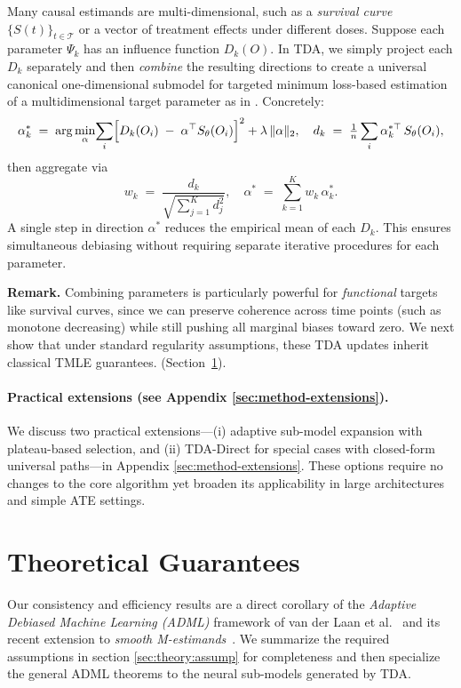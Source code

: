 \documentclass{article}
\theoremstyle{remark}
\begin{document}
Many causal estimands are multi-dimensional, such as a \emph{survival curve} $\{S(t)\}_{t\in\mathcal{T}}$ or a vector of treatment effects under different doses.  Suppose each parameter $\Psi_k$ has an influence function $D_k(O)$.  In TDA, we simply project each $D_k$ separately and then \emph{combine} the resulting directions to create a universal canonical one-dimensional submodel for targeted minimum
loss-based estimation of a multidimensional target parameter as in \cite{van2016one}.  Concretely:
\[
  \alpha^*_k 
  \;=\;
  \arg\min_{\alpha}\!\sum_i \Bigl[
    D_k(O_i) \;-\;\alpha^\top S_{\theta}(O_i)\Bigr]^2 
    + \lambda\,\|\alpha\|_2,
  \quad
  d_k \;=\;\tfrac1n\sum_i\alpha_k^{*\top}\,S_{\theta}(O_i),
\]
then aggregate via
\[
  w_k \;=\; \frac{d_k}{\sqrt{\sum_{j=1}^K d_j^2}}, 
  \quad
  \alpha^* 
  \;=\;\sum_{k=1}^K w_k\,\alpha^*_k.
\]
A single step in direction $\alpha^*$ reduces the empirical mean of each $D_k$.  This ensures simultaneous debiasing without requiring separate iterative procedures for each parameter.

\vspace{0.5em}
\noindent \textbf{Remark.}  
Combining parameters is particularly powerful for \emph{functional} targets like survival curves, since we can preserve coherence across time points (such as monotone decreasing) while still pushing all marginal biases toward zero.  We next show that under standard regularity assumptions, these TDA updates inherit classical TMLE guarantees.  (Section~\ref{sec:theory}). 

\paragraph{Practical extensions (see Appendix \ref{sec:method-extensions}).}
We discuss two practical extensions—(i) adaptive sub-model expansion with
plateau-based selection, and (ii) TDA-Direct for special cases with
closed-form universal paths—in Appendix \ref{sec:method-extensions}.  
These options require no changes to the core algorithm yet broaden its
applicability in large architectures and simple ATE settings.

\section{Theoretical Guarantees}
\label{sec:theory}


Our consistency and efficiency results are a direct corollary of the \emph{Adaptive
Debiased Machine Learning (ADML)} framework of
van der Laan et al.~\cite{van2023adaptive} and its recent extension to \emph{smooth
M-estimands}~\cite{van2025automatic}.  We summarize the required assumptions
in section \ref{sec:theory:assump} for completeness and then specialize the general ADML
theorems to the neural sub-models generated by TDA.
\end{document}

